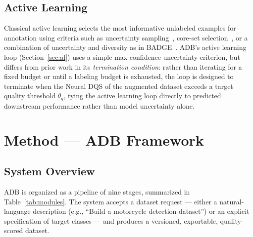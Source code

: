 \documentclass[11pt]{article}
\begin{document}
\subsection{Active Learning}

Classical active learning selects the most informative unlabeled examples
for annotation using criteria such as uncertainty
sampling~\citep{lewis1994sequential}, core-set
selection~\citep{sener2018active}, or a combination of uncertainty and
diversity as in BADGE~\citep{ash2020deep}. ADB's active learning loop
(Section~\ref{sec:al}) uses a simple max-confidence uncertainty criterion,
but differs from prior work in its \emph{termination condition}: rather than
iterating for a fixed budget or until a labeling budget is exhausted, the
loop is designed to terminate when the Neural DQS of the augmented dataset
exceeds a target quality threshold $\theta_q$, tying the active learning
loop directly to predicted downstream performance rather than model
uncertainty alone.

\section{Method --- ADB Framework}
\label{sec:adb}

\subsection{System Overview}

ADB is organized as a pipeline of nine stages, summarized in
Table~\ref{tab:modules}. The system accepts a dataset request --- either a
natural-language description (e.g., ``Build a motorcycle detection
dataset'') or an explicit specification of target classes --- and produces a
versioned, exportable, quality-scored dataset.
\end{document}
